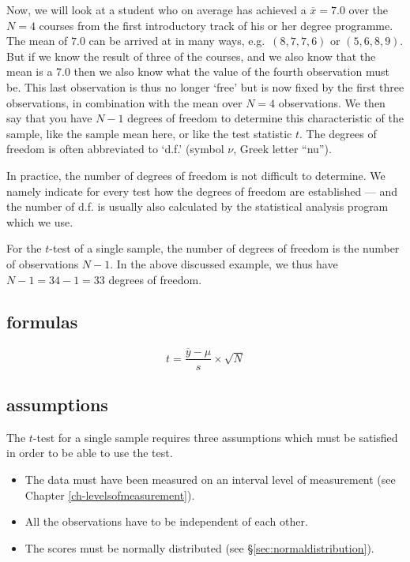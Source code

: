 \documentclass[
]{book}
\begin{document}
Now, we will look at a student who on average has achieved a \(\overline{x}=7.0\)
over the \(N=4\) courses from the first introductory track of his or her
degree programme. The mean of \(7.0\) can be arrived at in many ways,
e.g.~\((8,7,7,6)\) or \((5,6,8,9)\). But if we know the result of three of the courses,
and we also know that the mean is a 7.0 then we also know what the value
of the fourth observation must be. This last observation is thus no longer
`free' but is now fixed by the first three observations, in combination
with the mean over \(N=4\) observations. We then say that you have \(N-1\)
degrees of freedom to determine this characteristic of the sample, like the sample mean here, or like the test statistic \(t\).
The degrees of freedom is often abbreviated to `d.f.' (symbol \(\nu\), Greek letter ``nu'').

In practice, the number of degrees of freedom is not difficult to determine.
We namely indicate for every test how the degrees of freedom are established
--- and the number of d.f. is usually also calculated by the
statistical analysis program which we use.

For the \(t\)-test of a single sample, the number of degrees of freedom is the
number of observations \(N-1\). In the above discussed example, we thus have
\(N-1 = 34-1 = 33\) degrees of freedom.

\hypertarget{sec:formulas13-1}{%
\subsection{formulas}\label{sec:formulas13-1}}

\begin{equation}
  t = \frac{ \overline{y}-\mu} { s } \times \sqrt{N}
  \label{eq:t-onesample}
\end{equation}

\hypertarget{sec:ttest-assumptions}{%
\subsection{assumptions}\label{sec:ttest-assumptions}}

The \(t\)-test for a single sample requires three assumptions which
must be satisfied in order to be able to use the test.

\begin{itemize}
\item
  The data must have been measured on an interval level of measurement (see
  Chapter \ref{ch-levelsofmeasurement}).
\item
  All the observations have to be independent of each other.
\item
  The scores must be normally distributed (see
  §\ref{sec:normaldistribution}).
\end{itemize}
\end{document}
